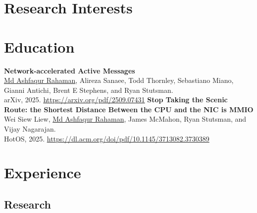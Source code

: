 \documentclass[11pt,a4paper,sans]{moderncv}
\begin{document}
\maketitle

\section{Research Interests}


\section{Education}


\begin{thebibliography}{9}
   \textbf{Network-accelerated Active Messages}\\
  \underline{Md Ashfaqur Rahaman}, Alireza Sanaee, Todd Thornley, Sebastiano Miano, Gianni Antichi, Brent E Stephens, and Ryan Stutsman.\\
    arXiv, 2025. \url{https://arxiv.org/pdf/2509.07431}
   \textbf{Stop Taking the Scenic Route: the Shortest Distance Between the CPU and the NIC is MMIO}\\
    Wei Siew Liew, \underline{Md Ashfaqur Rahaman}, James McMahon, Ryan Stutsman, and Vijay Nagarajan.\\
    HotOS, 2025. \url{https://dl.acm.org/doi/pdf/10.1145/3713082.3730389}
\end{thebibliography}

\section{Experience}
\subsection{Research}
\end{document}
